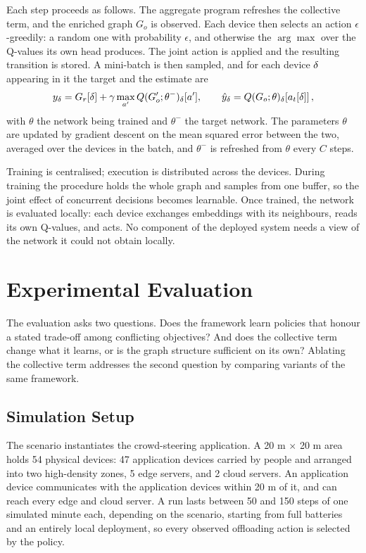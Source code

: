 Each step proceeds as follows.
%
The aggregate program refreshes the collective term, and the enriched graph $G_o$ is observed.
%
Each device then selects an action $\epsilon$-greedily:
a random one with probability $\epsilon$,
and otherwise the $\arg\max$ over the Q-values its own head produces.
%
The joint action is applied and the resulting transition is stored.
%
A mini-batch is then sampled,
and for each device $\delta$ appearing in it the target and the estimate are
\[
    y_{\delta} = G_r[\delta] + \gamma \max_{a'} Q(G'_o;\theta^-)_{\delta}[a'],
    \qquad
    \hat{y}_{\delta} = Q(G_o;\theta)_{\delta}\!\left[a_t[\delta]\right],
\]
with $\theta$ the network being trained and $\theta^-$ the target network.
%
The parameters $\theta$ are updated by gradient descent on the mean squared error between the two,
averaged over the devices in the batch,
and $\theta^-$ is refreshed from $\theta$ every $C$ steps.

Training is centralised; execution is distributed across the devices.
%
During training the procedure holds the whole graph and samples from one buffer,
so the joint effect of concurrent decisions becomes learnable.
%
Once trained, the network is evaluated locally:
each device exchanges embeddings with its neighbours, reads its own Q-values, and acts.
%
No component of the deployed system needs a view of the network it could not obtain locally.

\section{Experimental Evaluation}
\label{sec:idhgql-evaluation}

The evaluation asks two questions.
%
Does the framework learn policies that honour a stated trade-off among conflicting objectives?
%
And does the collective term change what it learns,
or is the graph structure sufficient on its own?
%
Ablating the collective term addresses the second question by comparing variants of the same framework.

\subsection{Simulation Setup}
\label{subsec:idhgql-setup}

The scenario instantiates the crowd-steering application.
%
A 20 m $\times$ 20 m area holds 54 physical devices:
47 application devices carried by people and arranged into two high-density zones,
5 edge servers,
and 2 cloud servers.
%
An application device communicates with the application devices within 20 m of it,
and can reach every edge and cloud server.
%
A run lasts between 50 and 150 steps of one simulated minute each, depending on the scenario,
starting from full batteries and an entirely local deployment,
so every observed offloading action is selected by the policy.

